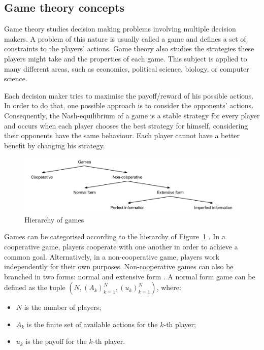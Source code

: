 \subsection{Game theory concepts}

Game theory studies decision making problems involving multiple decision makers.
A problem of this nature is usually called a game and defines a set of constraints to the players' actions.
Game theory also studies the strategies these players might take and the properties of each game.
This subject is applied to many different areas, such as economics, political science, biology, or computer science.

Each decision maker tries to maximise the payoff/reward of his possible actions.
In order to do that, one possible approach is to consider the opponents' actions.
Consequently, the Nash-equilibrium \cite{Nash1950} of a game is a stable strategy for every player and occurs when each player chooses the best strategy for himself, considering their opponents have the same behaviour.
Each player cannot have a better benefit by changing his strategy.

\begin{figure}
\centering
\includegraphics[width=1\textwidth]{./img/gamesHierarchy}
\caption{Hierarchy of games}
\label{fig:games}
\end{figure}

Games can be categorised according to the hierarchy of Figure~\ref{fig:games} \cite{Osborne2011}.
In a cooperative game, players cooperate with one another in order to achieve a common goal.
Alternatively, in a non-cooperative game, players work independently for their own purposes.
Non-cooperative games can also be branched in two forms: normal and extensive form \cite{Shoham2010}.
A normal form game can be defined as the tuple $(N,(A_k)_{k=1}^{N},(u_k)_{k=1}^{N})$, where:

\begin{itemize}
\item $N$ is the number of players;
\item $A_k$ is the finite set of available actions for the $k$-th player;
\item $u_k$ is the payoff for the $k$-th player.
\end{itemize}

